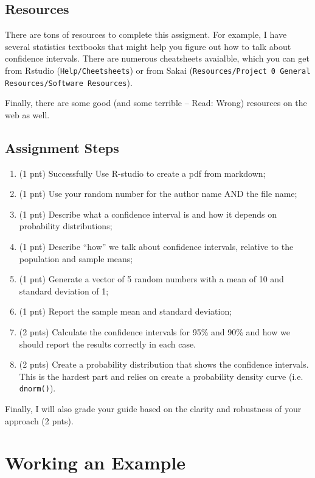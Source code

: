 \documentclass{tufte-handout}\usepackage[]{graphicx}\usepackage[]{color}
\begin{document}
\subsection{Resources}

There are tons of resources to complete this assigment. For example, I have several statistics textbooks that might help you figure out how to talk about confidence intervals. 
There are numerous cheatsheets avaialble, which you can get from Rstudio (\texttt{Help/Cheetsheets}) or from Sakai (\texttt{Resources/Project 0 General Resources/Software Resources}).

Finally, there are some good (and some terrible -- Read: Wrong) resources on the web as well. 

\subsection{Assignment Steps}

\begin{enumerate}
  \item (1 pnt) Successfully Use R-studio to create a pdf from markdown; 
  \item (1 pnt) Use your random number for the author name AND the file name;
  \item (1 pnt) Describe what a confidence interval is and how it depends on probability distributions; 
  \item (1 pnt) Describe ``how'' we talk about confidence intervals, relative to the population and sample means;
  \item (1 pnt) Generate a vector of 5 random numbers with a mean of 10 and standard deviation of 1;
  \item (1 pnt) Report the sample mean and standard deviation;
  \item (2 pnts) Calculate the confidence intervals for 95\% and 90\% and how we should report the results correctly in each case.
  \item (2 pnts) Create a probability distribution that shows the confidence intervals. This is the hardest part and relies on create a probability density curve (i.e. \texttt{dnorm()}). 
  
\end{enumerate}

Finally, I will also grade your guide based on the clarity and robustness of your approach (2 pnts). 

\section{Working an Example}
\end{document}
